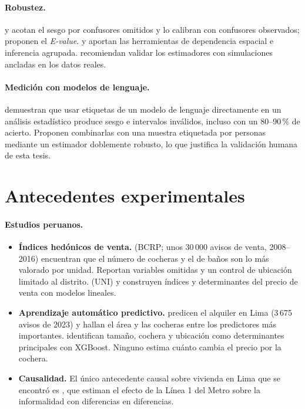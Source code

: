 \paragraph{Robustez.} \citet{cinelli2020} y \citet{chernozhukov2022} acotan el sesgo por confusores omitidos y lo calibran con confusores observados; \citet{vanderweele2017} proponen el \textit{E-value}. \citet{moran1950} y \citet{cameron2015} aportan las herramientas de dependencia espacial e inferencia agrupada. \citet{advani2019} recomiendan validar los estimadores con simulaciones ancladas en los datos reales.

\paragraph{Medición con modelos de lenguaje.} \citet{egami2023} demuestran que usar etiquetas de un modelo de lenguaje directamente en un análisis estadístico produce sesgo e intervalos inválidos, incluso con un 80--90\,\% de acierto. Proponen combinarlas con una muestra etiquetada por personas mediante un estimador doblemente robusto, lo que justifica la validación humana de esta tesis.

\section{Antecedentes experimentales}\label{sec:ant_exp}

\paragraph{Estudios peruanos.}\label{sec:peru}
\begin{itemize}[leftmargin=*]
\item \textbf{Índices hedónicos de venta.} \citet{mundaca2018} (BCRP; unos 30\,000 avisos de venta, 2008--2016) encuentran que el número de cocheras y el de baños son lo más valorado por unidad. Reportan variables omitidas y un control de ubicación limitado al distrito. \citet{mayo2017} (UNI) y \citet{rivera2018} construyen índices y determinantes del precio de venta con modelos lineales.
\item \textbf{Aprendizaje automático predictivo.} \citet{cacnahuaray2024} predicen el alquiler en Lima (3\,675 avisos de 2023) y hallan el área y las cocheras entre los predictores más importantes. \citet{barrientos2026} identifican tamaño, cochera y ubicación como determinantes principales con XGBoost. Ninguno estima cuánto cambia el precio por la cochera.
\item \textbf{Causalidad.} El único antecedente causal sobre vivienda en Lima que se encontró es \citet{contreras2024}, que estiman el efecto de la Línea 1 del Metro sobre la informalidad con diferencias en diferencias.
\end{itemize}

